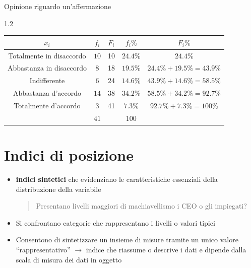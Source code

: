 \documentclass[compress]{beamer}
\newcommand\Factor{1.2}
\begin{document}
\begin{frame}
	\begin{block}{Opinione riguardo un'affermazione}
		\begin{spacing}\Factor
			
			\begin{table}
				\centering
				\begin{tabular}{|c | c | c| c | c|}
					\hline
					$x_i$ & $f_i$ & $F_i$&	$f_i\%$ & $F_i\%$ \\
					\hline
					Totalmente in disaccordo & $10$ & 10 & $24.4\%$ & $24.4$\%\\
					Abbastanza in disaccordo & $8$ &18 & $19.5\%$ & $24.4\% + 19.5\% = 43.9$\%\\
					Indifferente & $6$ &24& $ 14.6\%$ & $43.9\% + 14.6\% = 58.5$\% \\
				Abbastanza d'accordo & $14$&38 & $34.2\%$ & $58.5\% + 34.2\% = 92.7$\%\\
					Totalmente d'accordo & $3$ &41& $7.3\%$ & $92.7\% + 7.3\% = 100$\% \\

					\hline
					& $41$ & &$100$  \\
					\hline
				\end{tabular}
			\end{table}
		\end{spacing}
	\end{block}
\end{frame}

\section{Indici di posizione}


\begin{frame}
\begin{itemize}
	\item \textbf{indici sintetici} che evidenziano le caratteristiche essenziali della distribuzione della variabile
	
	\vspace{3mm}
	\begin{quote}
		
		
Presentano livelli maggiori di machiavellismo i CEO o gli impiegati?
	\end{quote}
\vspace{3mm} 

\item Si confrontano categorie che rappresentano i livelli o valori tipici

\item Consentono di sintetizzare un insieme di misure tramite un unico valore ``rappresentativo'' $\rightarrow$ indice che riassume o descrive i dati e dipende dalla scala di misura dei dati in oggetto
\end{itemize}

\end{frame}
\end{document}
